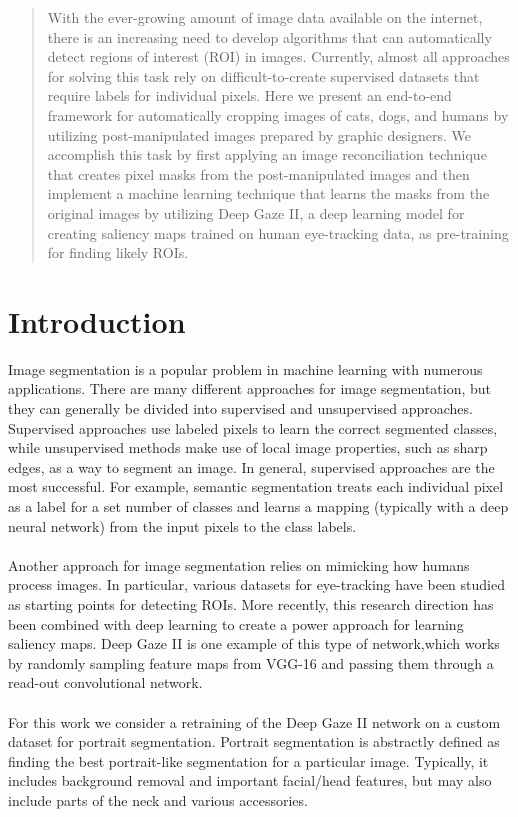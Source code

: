 \documentclass[portrait]{sciposter}
\begin{document}
\begin{multicols}{2}

\begin{abstract}
With the ever-growing amount of image data available on the internet, there is an increasing need to develop algorithms that can automatically detect regions of interest (ROI) in images. Currently, almost all approaches for solving this task rely on difficult-to-create supervised datasets that require labels for individual pixels. Here we present an end-to-end framework for automatically cropping images of cats, dogs, and humans by utilizing post-manipulated images prepared by graphic designers. We accomplish this task by first applying an image reconciliation technique that creates pixel masks from the post-manipulated images and then implement a machine learning technique that learns the masks from the original images by utilizing Deep Gaze II, a deep learning model for creating saliency maps trained on human eye-tracking data, as pre-training for finding likely ROIs. 
\end{abstract} 


\section*{Introduction}

Image segmentation is a popular problem in machine learning with numerous applications. There are many different approaches for image segmentation, but they can generally be divided into supervised and unsupervised approaches. Supervised approaches use labeled pixels to learn the correct segmented classes, while unsupervised methods make use of local image properties, such as sharp edges, as a way to segment an image. In general, supervised approaches are the most successful. For example, semantic segmentation treats each individual pixel as a label for a set number of classes and learns a mapping (typically with a deep neural network) from the input pixels to the class labels. 
\\ 
\\
Another approach for image segmentation relies on mimicking how humans process images. In particular, various datasets for eye-tracking have been studied as starting points for detecting ROIs. More recently, this research direction has been combined with deep learning to create a power approach for learning saliency maps. Deep Gaze II is one example of this type of network,which works by randomly sampling feature maps from VGG-16 and passing them through a read-out convolutional network. 
\\ 
\\
For this work we consider a retraining of the Deep Gaze II network on a custom dataset for portrait segmentation. Portrait segmentation is abstractly defined as finding the best portrait-like segmentation for a particular image. Typically, it includes background removal and important facial/head features, but may also include parts of the neck and various accessories.


\end{multicols}
\end{document}
